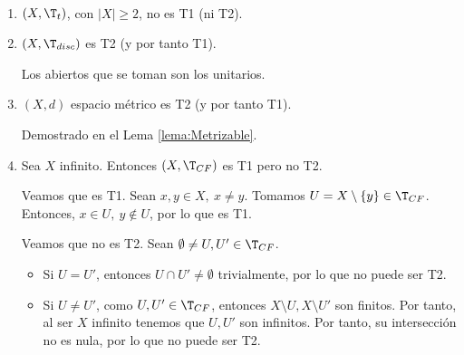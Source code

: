 \begin{ejemplo}\
\begin{enumerate}
    \item $(X,\T_t)$, con $|X|\geq 2$, no es T1 (ni T2).
    \item $(X,\T_{disc})$ es T2 (y por tanto T1).
    
    Los abiertos que se toman son los unitarios.
    \item $(X,d)$ espacio métrico es T2 (y por tanto T1).

    Demostrado en el Lema \ref{lema:Metrizable}.

    \item \label{ex:T_CF_T1noT2}
    Sea $X$ infinito. Entonces $(X,\T_{CF})$ es T1 pero no T2.

    Veamos que es T1. Sean $x,y\in X,~x\neq y$. Tomamos $U=X\setminus \{y\}\in \T_{CF}$. Entonces, $x\in U,~y\notin U$, por lo que es T1.

    Veamos que no es T2. Sean $\emptyset\neq U, U'\in \T_{CF}$.
    \begin{itemize}
        \item Si $U=U'$, entonces $U\cap U'\neq \emptyset$ trivialmente, por lo que no puede ser T2.
        \item Si $U\neq U'$, como $U,U'\in \T_{CF}$, entonces $X\setminus U,X\setminus U'$ son finitos. Por tanto, al ser $X$ infinito tenemos que $U,U'$ son infinitos. Por tanto, su intersección no es nula, por lo que no puede ser T2.
    \end{itemize}
\end{enumerate}
\end{ejemplo}


